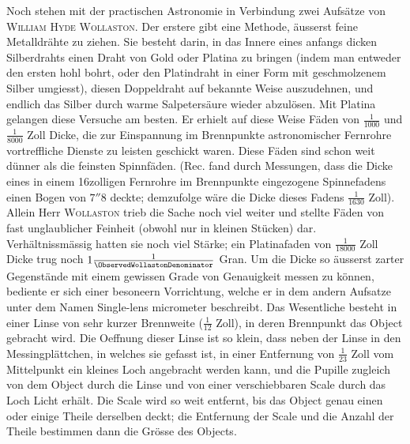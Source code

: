 Noch stehen mit der practischen Astronomie in Verbindung zwei Aufsätze von \textsc{William Hyde Wollaston}. Der erstere gibt eine Methode, äusserst feine Metalldrähte zu ziehen. Sie besteht darin, in das Innere eines anfangs dicken Silberdrahts einen Draht von Gold oder Platina zu bringen (indem man entweder den ersten hohl bohrt, oder den Platindraht in einer Form mit geschmolzenem Silber umgiesst), diesen Doppeldraht auf bekannte Weise auszudehnen, und endlich das Silber durch warme Salpetersäure wieder abzulösen. Mit Platina gelangen diese Versuche am besten. Er erhielt auf diese Weise Fäden von $\frac{1}{1000}$ und $\frac{1}{8000}$ Zoll Dicke, die zur Einspannung im Brennpunkte astronomischer Fernrohre vortreffliche Dienste zu leisten geschickt waren. Diese Fäden sind schon weit dünner als die feinsten Spinnfäden. (Rec. fand durch Messungen, dass die Dicke eines in einem 16zolligen Fernrohre im Brennpunkte eingezogene Spinnefadens einen Bogen von $7''8$ deckte; demzufolge wäre die Dicke dieses Fadens $\frac{1}{1630}$ Zoll). Allein Herr \textsc{Wollaston} trieb die Sache noch viel weiter und stellte Fäden von fast unglaublicher Feinheit (obwohl nur in kleinen Stücken) dar. Verhältnissmässig hatten sie noch viel Stärke; ein Platinafaden von $\frac{1}{18000}$ Zoll Dicke trug noch $1\frac{1}{\ObservedWollastonDenominator}$ Gran. Um die Dicke so äusserst zarter Gegenstände mit einem gewissen Grade von Genauigkeit messen zu können, bediente er sich einer besoneern Vorrichtung, welche er in dem andern Aufsatze unter dem Namen Single-lens micrometer beschreibt. Das Wesentliche besteht in einer Linse von sehr kurzer Brennweite ($\frac{1}{12}$ Zoll), in deren Brennpunkt das Object gebracht wird. Die Oeffnung dieser Linse ist so klein, dass neben der Linse in den Messingplättchen, in welches sie gefasst ist, in einer Entfernung von $\frac{1}{23}$ Zoll vom Mittelpunkt ein kleines Loch angebracht werden kann, und die Pupille zugleich von dem Object durch die Linse und von einer verschiebbaren Scale durch das Loch Licht erhält. Die Scale wird so weit entfernt, bis das Object genau einen oder einige Theile derselben deckt; die Entfernung der Scale und die Anzahl der Theile bestimmen dann die Grösse des Objects.

